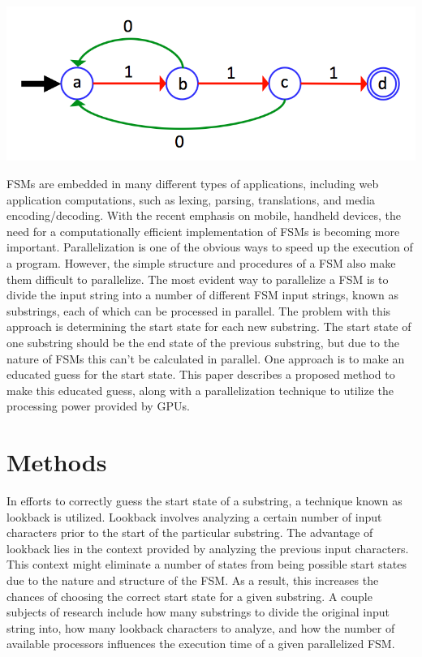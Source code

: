 \documentclass{sigplanconf}
\begin{document}
\includegraphics[width=\linewidth]{fsm_diagram.png}

FSMs are embedded in many different types of applications, including web application computations, such as lexing, parsing, translations, and media encoding/decoding. With the recent emphasis on mobile, handheld devices, the need for a computationally efficient implementation of FSMs is becoming more important. Parallelization is one of the obvious ways to speed up the execution of a program. However, the simple structure and procedures of a FSM also make them difficult to parallelize. The most evident way to parallelize a FSM is to divide the input string into a number of different FSM input strings, known as substrings, each of which can be processed in parallel. The problem with this approach is determining the start state for each new substring. The start state of one substring should be the end state of the previous substring, but due to the nature of FSMs this can't be calculated in parallel. One approach is to make an educated guess for the start state. This paper describes a proposed method to make this educated guess, along with a parallelization technique to utilize the processing power provided by GPUs.

\section{Methods}

In efforts to correctly guess the start state of a substring, a technique known as lookback is utilized. Lookback involves analyzing a certain number of input characters prior to the start of the particular substring. The advantage of lookback lies in the context provided by analyzing the previous input characters. This context might eliminate a number of states from being possible start states due to the nature and structure of the FSM. As a result, this increases the chances of choosing the correct start state for a given substring. A couple subjects of research include how many substrings to divide the original input string into, how many lookback characters to analyze, and how the number of available processors influences the execution time of a given parallelized FSM.
\end{document}
